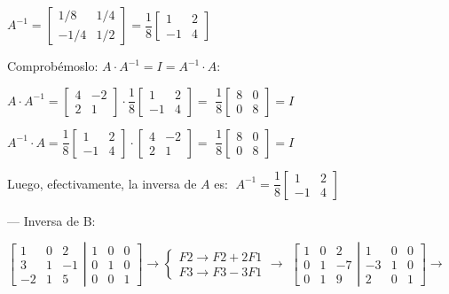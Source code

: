 \begin{ejem}
$A^{-1}=\left[ \begin{matrix}1/8&1/4\\-1/4&1/2\end{matrix} \right]=\dfrac 1 8 \left[ \begin{matrix}1&2\\-1&4\end{matrix} \right]$

Comprobémoslo: $A\cdot A^{-1} = I = A^{-1}\cdot A$:

$A\cdot A^{-1} = \left[\begin{matrix} 4&-2\\2&1  \end{matrix}\right] \cdot \dfrac 1 8 \left[ \begin{matrix}1&2\\-1&4\end{matrix} \right] = $
$\dfrac 1 8 \left [ \begin{matrix} 8&0\\0&8 \end{matrix} \right]=I$


$A^{-1} \cdot A =   \dfrac 1 8 \left[ \begin{matrix}1&2\\-1&4\end{matrix} \right] \cdot \left[\begin{matrix} 4&-2\\2&1  \end{matrix}\right]=$
$\dfrac 1 8 \left [ \begin{matrix} 8&0\\0&8 \end{matrix} \right]=I$

Luego, efectivamente, la inversa de $A$ es: $ \; A^{-1}=\dfrac 1 8 \left[ \begin{matrix}1&2\\-1&4\end{matrix} \right] \; $

--- Inversa de B:




\noindent \small{
$\left[\begin{matrix} 1&0&2\\3&1&-1\\-2&1&5  \end{matrix}\right|
\left. \begin{matrix} 1&0&0 \\ 0&1&0 \\0&0&1  \end{matrix} \right] \to \begin{cases} F2\to F2+2F1 \\ F3\to F3-3F1   \end{cases} \to $	
$\left[\begin{matrix} 1&0&2\\0&1&-7\\0&1&9  \end{matrix}\right|
\left. \begin{matrix} 1&0&0 \\ -3&1&0 \\2&0&1  \end{matrix} \right] \to $}


\end{ejem}
